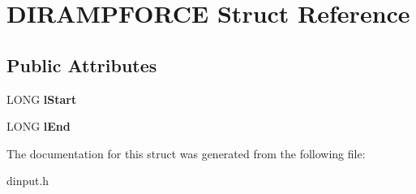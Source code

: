 \hypertarget{struct_d_i_r_a_m_p_f_o_r_c_e}{\section{D\-I\-R\-A\-M\-P\-F\-O\-R\-C\-E Struct Reference}
\label{struct_d_i_r_a_m_p_f_o_r_c_e}
}
\subsection*{Public Attributes}
\begin{DoxyCompactItemize}
\item 
\hypertarget{struct_d_i_r_a_m_p_f_o_r_c_e_aecdca7cb0e7ae5dccb6c4de289362491}{L\-O\-N\-G {\bfseries l\-Start}}\label{struct_d_i_r_a_m_p_f_o_r_c_e_aecdca7cb0e7ae5dccb6c4de289362491}

\item 
\hypertarget{struct_d_i_r_a_m_p_f_o_r_c_e_aa6012292aacf8cade64400e8d73d61b0}{L\-O\-N\-G {\bfseries l\-End}}\label{struct_d_i_r_a_m_p_f_o_r_c_e_aa6012292aacf8cade64400e8d73d61b0}

\end{DoxyCompactItemize}


The documentation for this struct was generated from the following file\-:\begin{DoxyCompactItemize}
\item 
dinput.\-h\end{DoxyCompactItemize}
